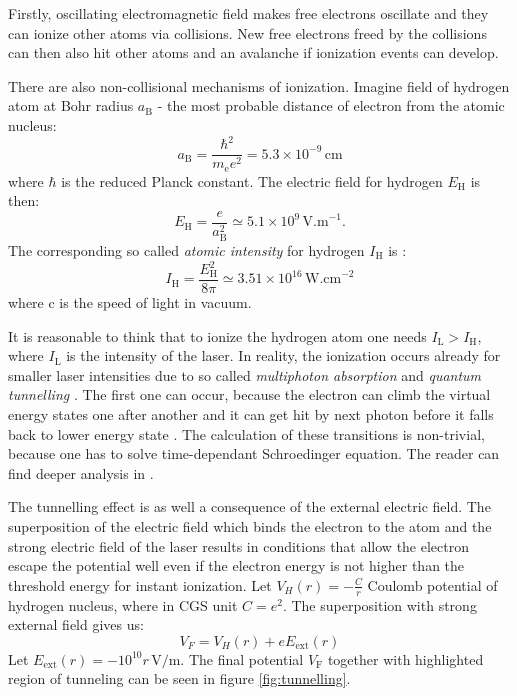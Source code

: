 Firstly, oscillating electromagnetic field makes free electrons oscillate and they can ionize other atoms via collisions. New free electrons freed by the collisions can then also hit other atoms and an avalanche if ionization events can develop.

There are also non-collisional mechanisms of ionization. Imagine field of hydrogen atom at Bohr radius $a_\mathrm{B}$ - the most probable distance of electron from the atomic nucleus:
\begin{equation}
	a_\mathrm{B} = \frac{\hbar^2}{m_\mathrm{e}e^2} = 5.3 \times 10^{-9} \, \mathrm{ cm}
\end{equation}
\noindent where $\hbar$ is the reduced Planck constant.
The electric field for hydrogen $E_{\mathrm{H}}$ is then:
\begin{equation}
	E_{\mathrm{H}} = \frac{e}{a_\mathrm{B}^2} \simeq 5.1 \times 10^{9} \, \mathrm{V.m}^{-1}.
\end{equation}
\noindent The corresponding so called \textit{atomic intensity} for hydrogen $I_{\mathrm{H}}$ is \cite{plasma-intro}:
\begin{equation}
	I_{\mathrm{H}} = \frac{E_{\mathrm{H}}^2}{8\pi} \simeq 3.51 \times 10^{16} \, \mathrm{W.cm}^{-2}
\end{equation}
\noindent where c is the speed of light in vacuum.

It is reasonable to think that to ionize the hydrogen atom one needs $I_\mathrm{L}>I_{\mathrm{H}}$, where $I_{\mathrm{L}}$ is the intensity of the laser. In reality, the ionization occurs already for smaller laser intensities due to so called \textit{multiphoton absorption} \cite{plasma-intro} and \textit{quantum tunnelling} \cite{laser-plasma1}. The first one can occur, because the electron can climb the virtual energy states one after another and it can get hit by next photon before it falls back to lower energy state \cite{laser-plasma1}. The calculation of these transitions is non-trivial, because one has to solve time-dependant Schroedinger equation. The reader can find deeper analysis in \cite{atoms-in-lasers}.

The tunnelling effect is as well a consequence of the external electric field. The superposition of the electric field which binds the electron to the atom and the strong electric field of the laser results in conditions that allow the electron escape the potential well even if the electron energy is not higher than the threshold energy for instant ionization. Let $V_H(r)= -\frac{C}{r}$ Coulomb potential of hydrogen nucleus, where in CGS unit $C = e^2$. The superposition with strong external field gives us:
\begin{equation}
	V_F = V_H(r) + eE_{\mathrm{ext}}(r)
\end{equation}
Let $E_{\mathrm{ext}}(r) = -10^{10}r\,\mathrm{V/m}$. The final potential $V_\mathrm{F}$ together with highlighted region of tunneling can be seen in figure \ref{fig:tunnelling}. 

